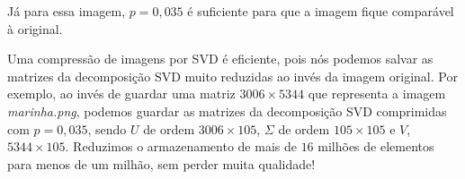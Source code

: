 \documentclass[11pt]{article}
\begin{document}
\begin{enumerate}
            Já para essa imagem, $p = 0,035$ é suficiente para que a imagem fique comparável à original.
            
            \bigbreak
            
            Uma compressão de imagens por SVD é eficiente, pois nós podemos salvar as matrizes da decomposição SVD muito reduzidas ao invés da imagem original. Por exemplo, ao invés de guardar uma matriz $3006 \times 5344$ que representa a imagem \textit{marinha.png}, podemos guardar as matrizes da decomposição SVD comprimidas com $p = 0,035$, sendo $U$ de ordem $3006 \times 105$, $\Sigma$ de ordem $105 \times 105$ e $V$, $5344 \times 105$. Reduzimos o armazenamento de mais de $16$ milhões de elementos para menos de um milhão, sem perder muita qualidade!
        
    \end{enumerate}
\end{document}
